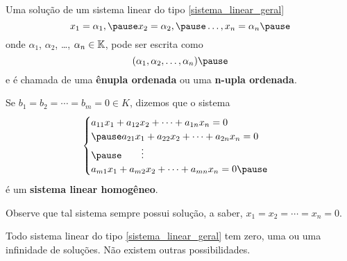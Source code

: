 \documentclass{beamer}
\begin{document}
    \begin{frame}
        \vspace{.3cm}

        Uma solução de um sistema linear do tipo \eqref{sistema_linear_geral}\pause
        \[
            x_1 = \alpha_1, \pause x_2 = \alpha_2, \pause \dots, x_n = \alpha_n\pause
        \]
        onde $\alpha_1$, $\alpha_2$, \dots, $\alpha_n \in \mathbb{K}$, \pause pode ser escrita como\pause
        \[
            (\alpha_1, \alpha_2, \dots, \alpha_n)\pause
        \]
        e é chamada de uma \textbf{ênupla ordenada} \pause ou uma \textbf{n-upla ordenada}.
    \end{frame}

    \begin{frame}
        Se $b_1 = b_2 = \cdots = b_m = 0 \in K$, \pause dizemos que o sistema\pause
        \begin{equation}\label{sistemalinearhomogeneo}\index{Sistema Linear}
            \begin{cases}
                a_{11}x_1 + a_{12}x_2 + \cdots + a_{1n}x_n = 0\\\pause
                a_{21}x_1 + a_{22}x_2 + \cdots + a_{2n}x_n = 0\\\pause
                \qquad \vdots\\
                a_{m1}x_1 + a_{m2}x_2 + \cdots + a_{mn}x_n = 0\pause
            \end{cases}
        \end{equation}
        \'e um \textbf{sistema linear homog\^eneo}. \pause

        \vspace{.3cm}

        Observe que tal sistema sempre possui solu\c{c}\~ao, \pause a saber, $x_1 = x_2 = \cdots = x_n = 0$.
    \end{frame}

    \begin{frame}
        \begin{teorema}
            Todo sistema linear do tipo \eqref{sistema_linear_geral} tem zero, \pause uma \pause ou uma infinidade de soluções. \pause Não existem outras possibilidades.
        \end{teorema}
    \end{frame}
\end{document}
